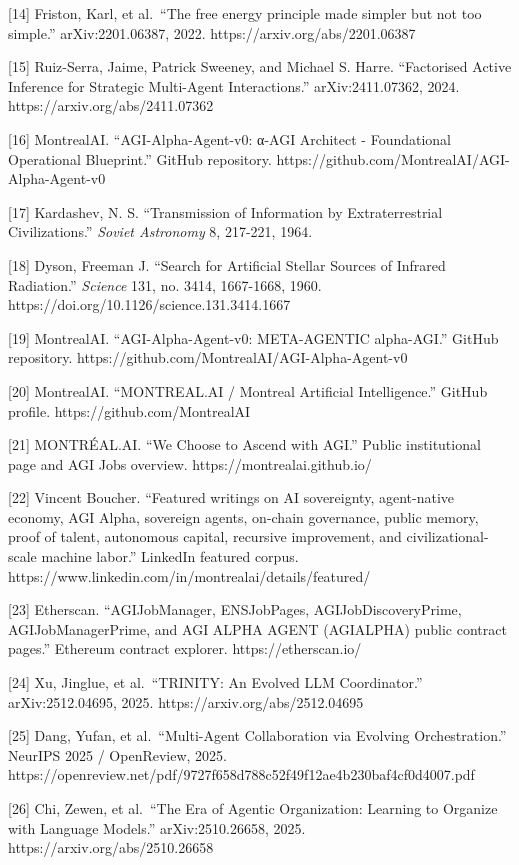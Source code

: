 {[}14{]} Friston, Karl, et al.~``The free energy principle made simpler
but not too simple.'' arXiv:2201.06387, 2022.
https://arxiv.org/abs/2201.06387

{[}15{]} Ruiz-Serra, Jaime, Patrick Sweeney, and Michael S. Harre.
``Factorised Active Inference for Strategic Multi-Agent Interactions.''
arXiv:2411.07362, 2024. https://arxiv.org/abs/2411.07362

{[}16{]} MontrealAI. ``AGI-Alpha-Agent-v0: α-AGI Architect -
Foundational Operational Blueprint.'' GitHub repository.
https://github.com/MontrealAI/AGI-Alpha-Agent-v0

{[}17{]} Kardashev, N. S. ``Transmission of Information by
Extraterrestrial Civilizations.'' \emph{Soviet Astronomy} 8, 217-221,
1964.

{[}18{]} Dyson, Freeman J. ``Search for Artificial Stellar Sources of
Infrared Radiation.'' \emph{Science} 131, no. 3414, 1667-1668, 1960.
https://doi.org/10.1126/science.131.3414.1667

{[}19{]} MontrealAI. ``AGI-Alpha-Agent-v0: META-AGENTIC alpha-AGI.''
GitHub repository. https://github.com/MontrealAI/AGI-Alpha-Agent-v0

{[}20{]} MontrealAI. ``MONTREAL.AI / Montreal Artificial Intelligence.''
GitHub profile. https://github.com/MontrealAI

{[}21{]} MONTRÉAL.AI. ``We Choose to Ascend with AGI.'' Public
institutional page and AGI Jobs overview. https://montrealai.github.io/

{[}22{]} Vincent Boucher. ``Featured writings on AI sovereignty,
agent-native economy, AGI Alpha, sovereign agents, on-chain governance,
public memory, proof of talent, autonomous capital, recursive
improvement, and civilizational-scale machine labor.'' LinkedIn featured
corpus. https://www.linkedin.com/in/montrealai/details/featured/

{[}23{]} Etherscan. ``AGIJobManager, ENSJobPages, AGIJobDiscoveryPrime,
AGIJobManagerPrime, and AGI ALPHA AGENT (AGIALPHA) public contract
pages.'' Ethereum contract explorer. https://etherscan.io/

{[}24{]} Xu, Jinglue, et al.~``TRINITY: An Evolved LLM Coordinator.''
arXiv:2512.04695, 2025. https://arxiv.org/abs/2512.04695

{[}25{]} Dang, Yufan, et al.~``Multi-Agent Collaboration via Evolving
Orchestration.'' NeurIPS 2025 / OpenReview, 2025.
https://openreview.net/pdf/9727f658d788c52f49f12ae4b230baf4cf0d4007.pdf

{[}26{]} Chi, Zewen, et al.~``The Era of Agentic Organization: Learning
to Organize with Language Models.'' arXiv:2510.26658, 2025.
https://arxiv.org/abs/2510.26658

